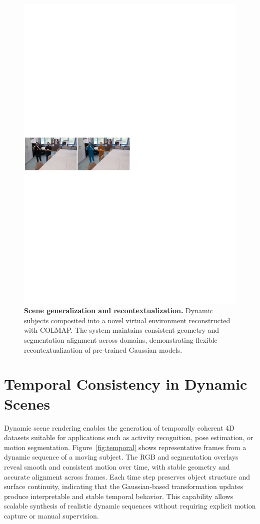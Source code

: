 \begin{figure}[ht]
    \centering
    \includegraphics[width=\linewidth]{Grafiken/room_transfer.pdf}
    \caption{
        \textbf{Scene generalization and recontextualization.}
        Dynamic subjects composited into a novel virtual environment reconstructed with COLMAP.
        The system maintains consistent geometry and segmentation alignment across domains, 
        demonstrating flexible recontextualization of pre-trained Gaussian models.
    }
    \label{fig:generalization}
\end{figure}

\section{Temporal Consistency in Dynamic Scenes}
Dynamic scene rendering enables the generation of temporally coherent 4D datasets suitable for applications such as activity recognition, pose estimation, or motion segmentation. 
Figure~\ref{fig:temporal} shows representative frames from a dynamic sequence of a moving subject. 
The RGB and segmentation overlays reveal smooth and consistent motion over time, with stable geometry and accurate alignment across frames. 
Each time step preserves object structure and surface continuity, indicating that the Gaussian-based transformation updates produce interpretable and stable temporal behavior. 
This capability allows scalable synthesis of realistic dynamic sequences without requiring explicit motion capture or manual supervision.

